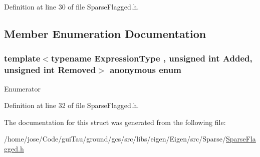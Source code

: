 Definition at line 30 of file Sparse\-Flagged.\-h.



\subsection{Member Enumeration Documentation}
\hypertarget{structei__traits_3_01_sparse_flagged_3_01_expression_type_00_01_added_00_01_removed_01_4_01_4_a68364af44b26aff88f5b0f8c78c7d136}{\subsubsection[{anonymous enum}]{\setlength{\rightskip}{0pt plus 5cm}template$<$typename Expression\-Type , unsigned int Added, unsigned int Removed$>$ anonymous enum}}\label{structei__traits_3_01_sparse_flagged_3_01_expression_type_00_01_added_00_01_removed_01_4_01_4_a68364af44b26aff88f5b0f8c78c7d136}
\begin{Desc}
\item[Enumerator]\par
\begin{description}
\item[{\em 
\hypertarget{structei__traits_3_01_sparse_flagged_3_01_expression_type_00_01_added_00_01_removed_01_4_01_4_a68364af44b26aff88f5b0f8c78c7d136ac26ff3a1e9892fc8346435919395f19c}{Flags}\label{structei__traits_3_01_sparse_flagged_3_01_expression_type_00_01_added_00_01_removed_01_4_01_4_a68364af44b26aff88f5b0f8c78c7d136ac26ff3a1e9892fc8346435919395f19c}
}]\end{description}
\end{Desc}


Definition at line 32 of file Sparse\-Flagged.\-h.



The documentation for this struct was generated from the following file\-:\begin{DoxyCompactItemize}
\item 
/home/jose/\-Code/gui\-Tau/ground/gcs/src/libs/eigen/\-Eigen/src/\-Sparse/\hyperlink{_sparse_flagged_8h}{Sparse\-Flagged.\-h}\end{DoxyCompactItemize}
